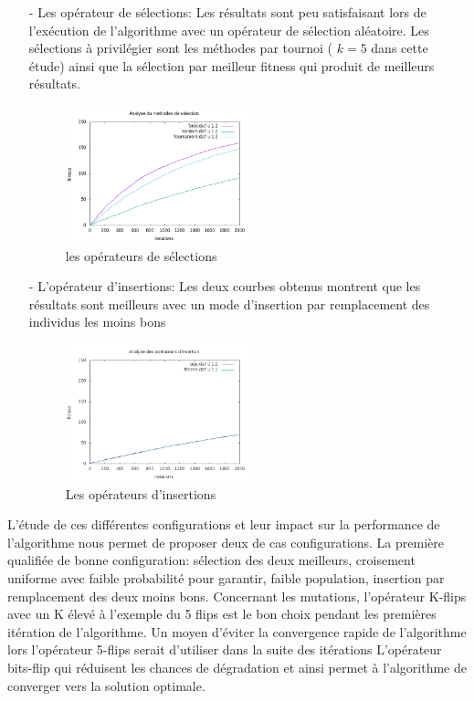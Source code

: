\documentclass[twocolumn]{article}
\begin{document}
\begin{itemize}
\item[-] Les  opérateur de sélections:
Les résultats sont peu satisfaisant lors de l'exécution de l'algorithme avec un opérateur de sélection aléatoire. Les sélections à privilégier sont les méthodes par tournoi ( $k=5$ dans cette étude) ainsi que la sélection par meilleur fitness qui produit de meilleurs résultats.

\begin{figure}[h]
    \centering
    \includegraphics[width=0.5\textwidth]{selections}{\center}
    \caption{les opérateurs de sélections}
\end{figure}

\item[-] L'opérateur d'insertions:
Les deux courbes obtenus montrent que les résultats sont meilleurs avec un mode d'insertion par remplacement des individus les moins bons

\begin{figure}[h]
    \centering
    \includegraphics[width=0.5\textwidth]{insertions}{\centering}
    \caption{Les opérateurs d'insertions}
\end{figure}

\end{itemize}

L'étude de ces différentes configurations et leur impact sur la performance de l'algorithme nous permet de proposer deux de cas configurations. La première qualifiée de bonne configuration: sélection des deux meilleurs, croisement uniforme avec faible probabilité pour garantir, faible population, insertion par remplacement des deux moins bons. Concernant les mutations, l'opérateur K-flips avec un K élevé à l'exemple du 5 flips est le bon choix pendant les premières itération de l'algorithme. Un moyen d'éviter la convergence rapide de l'algorithme lors l'opérateur 5-flips serait d'utiliser dans la suite des itérations L'opérateur bits-flip qui réduisent les chances de dégradation et ainsi permet à l'algorithme de converger vers la solution optimale.
\end{document}

